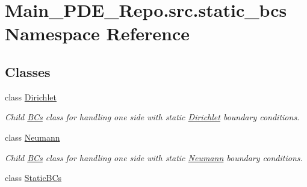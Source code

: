 \hypertarget{namespaceMain__PDE__Repo_1_1src_1_1static__bcs}{}\section{Main\+\_\+\+P\+D\+E\+\_\+\+Repo.\+src.\+static\+\_\+bcs Namespace Reference}
\label{namespaceMain__PDE__Repo_1_1src_1_1static__bcs}
\subsection*{Classes}
\begin{DoxyCompactItemize}
\item 
class \hyperlink{classMain__PDE__Repo_1_1src_1_1static__bcs_1_1Dirichlet}{Dirichlet}
\begin{DoxyCompactList}\small\item\em Child \hyperlink{namespaceMain__PDE__Repo_1_1src_1_1BCs}{B\+Cs} class for handling one side with static \hyperlink{classMain__PDE__Repo_1_1src_1_1static__bcs_1_1Dirichlet}{Dirichlet} boundary conditions. \end{DoxyCompactList}\item 
class \hyperlink{classMain__PDE__Repo_1_1src_1_1static__bcs_1_1Neumann}{Neumann}
\begin{DoxyCompactList}\small\item\em Child \hyperlink{namespaceMain__PDE__Repo_1_1src_1_1BCs}{B\+Cs} class for handling one side with static \hyperlink{classMain__PDE__Repo_1_1src_1_1static__bcs_1_1Neumann}{Neumann} boundary conditions. \end{DoxyCompactList}\item 
class \hyperlink{classMain__PDE__Repo_1_1src_1_1static__bcs_1_1StaticBCs}{Static\+B\+Cs}
\end{DoxyCompactItemize}
